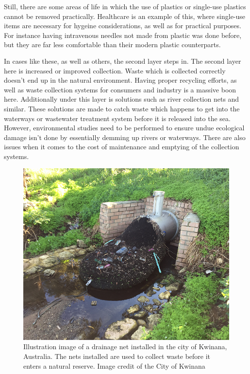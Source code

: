 \documentclass[class=article, crop=false]{standalone}
\begin{document}
Still, there are some areas of life in which the use of plastics or single-use plastics cannot be removed practically. Healthcare is an example of this, where single-use items are necessary for hygeine considerations, as well as for practical purposes. For instance having intravenous needles not made from plastic was done before, but they are far less comfortable than their modern plastic counterparts.

In cases like these, as well as others, the second layer steps in. The second layer here is increased or improved collection. Waste which is collected correctly doesn't end up in the natural environment. Having proper recycling efforts, as well as waste collection systems for consumers and industry is a massive boon here. Additionally under this layer is solutions such as river collection nets and similar. These solutions are made to catch waste which happens to get into the waterways or wastewater treatment system before it is released into the sea. However, environmental studies need to be performed to ensure undue ecological damage isn't done by essentially demming up rivers or waterways. There are also issues when it comes to the cost of maintenance and emptying of the collection systems.

\begin{figure}
	\centering
	\includegraphics{waste_net}
	\caption{Illustration image of a drainage net installed in the city of Kwinana, Australia. The nets installed are used to collect waste before it enters a natural reserve. Image credit of the City of Kwinana}
	\label{fig:waste_net}
\end{figure}
\end{document}

